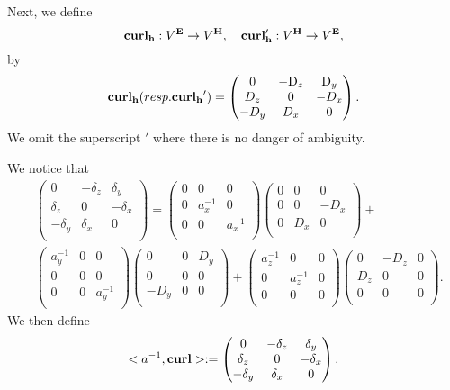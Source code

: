 \documentclass[12pt,reqno]{amsart}
\newcommand{\D}{{\rm D}}
\newcommand{\curl}{{\bf curl}}
\theoremstyle{definition}
\numberwithin{equation}{section}
\begin{document}
		
		
		Next, we define 
		$$
		\mathbf{\curl_h}:V^{\bf{E}}\to V^{\bf{H}}, \quad 
		\mathbf{\curl_h'}:V^{\bf{H}}\to V^{\bf{E}},
		$$
		by
		$$
		\mathbf{\curl_h}( resp. \mathbf{\curl_h}')=
		\begin{pmatrix}
			0& -\D_z & \D _y\\
			D_z&0&-D_x\\
			-D_y&D_x&0\\
		\end{pmatrix}.
		$$
		We omit the superscript $'$ where there is no danger of ambiguity.
		
		We notice that 
		\begin{align*}
			&
			\begin{pmatrix}
				0& -\delta_z & \delta _y\\
				\delta_z&0&-\delta_x\\
				-\delta_y&\delta_x&0\\
			\end{pmatrix}=
			\begin{pmatrix}
				0& 0 & 0\\
				0&a_x^{-1}&0\\
				0&0&a_x^{-1}\\
			\end{pmatrix}
			\begin{pmatrix}
				0& 0 & 0\\
				0&0&-D_x\\
				0&D_x&0\\
			\end{pmatrix}+\\&
			\begin{pmatrix}
				a_y^{-1}& 0 & 0\\
				0&0&0\\
				0&0&a_y^{-1}\\
			\end{pmatrix}
			\begin{pmatrix}
				0& 0 & D _y\\
				0&0&0\\
				-D_y&0&0\\
			\end{pmatrix}+
			\begin{pmatrix}
				a_z^{-1}& 0 & 0\\
				0&a_z^{-1}&0\\
				0&0&0\\
			\end{pmatrix}
			\begin{pmatrix}
				0& -D_z & 0\\
				D_z&0&0\\
				0&0&0\\
			\end{pmatrix}.
		\end{align*}
		We then define 
		$$
		<a^{-1},\curl>:=
		\begin{pmatrix}
			0& -\delta_z & \delta _y\\
			\delta_z&0&-\delta_x\\
			-\delta_y&\delta_x&0\\
		\end{pmatrix}.
		$$
		
\end{document}
